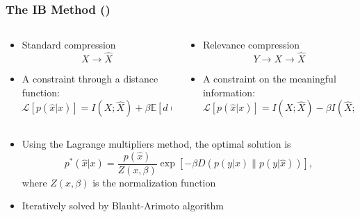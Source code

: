 \documentclass{beamer}
\begin{document}
\begin{frame}
    \frametitle{The IB Method (\cite{IB-method})}
    \begin{columns}[T]
        \begin{column}{0.5\textwidth}
            \begin{itemize}
                \item Standard compression
                \begin{equation*}
                    X\to \hat{X}
                \end{equation*}
                \item A constraint through a distance function:
                \begin{equation*}
                    \mathcal{L}\left[p\left(\hat{x}|x\right)\right] \!=\! I(X;\hat{X}) + \beta \mathbb{E}\left[d\left(x,\hat{x}\right)\right]
                \end{equation*}
            \end{itemize}
        \end{column}
        \begin{column}{0.5\textwidth}
            \begin{itemize}
                \item Relevance compression
                \begin{equation*}
                    Y\to X\to \hat{X}
                \end{equation*}
                \item A constraint on the meaningful information:
                \begin{equation*}
                    \mathcal{L}\left[p\left(\hat{x}|x\right)\right] \!=\! I(X;\hat{X}) - \beta I(\hat{X};Y)
                \end{equation*}
            \end{itemize}
        \end{column}
    \end{columns}
    \hspace{1cm}
    \begin{itemize}
        \item Using the Lagrange multipliers method, the optimal solution is
        \begin{equation}
            p^*(\hat{x}|x) = \frac{p(\hat{x})}{Z(x, \beta)} \exp\left[-\beta D\left(p(y|x)\|p(y|\hat{x})\right)\right],
        \end{equation}
        where $Z(x, \beta)$ is the normalization function
        \item Iteratively solved by Blauht-Arimoto algorithm
    \end{itemize}
\end{frame}
\end{document}
